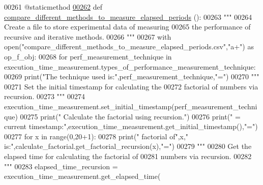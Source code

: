 \begin{DoxyCode}
00261     @staticmethod
\hypertarget{performance__measurement_8py_source_l00262}{}\hyperlink{classutilities_1_1timing__measurements_1_1performance__measurement_1_1execution__time__measurement_a9b05f1fd5acd56880daa42266dbf8284}{00262}     \textcolor{keyword}{def }\hyperlink{classutilities_1_1timing__measurements_1_1performance__measurement_1_1execution__time__measurement_a9b05f1fd5acd56880daa42266dbf8284}{compare\_different\_methods\_to\_measure\_elapsed\_periods}
      ():
00263         \textcolor{stringliteral}{"""}
00264 \textcolor{stringliteral}{            Create a file to store experimental data of measuring}
00265 \textcolor{stringliteral}{                the performance of recursive and iterative methods.}
00266 \textcolor{stringliteral}{        """}
00267         with open(\textcolor{stringliteral}{"compare\_different\_methods\_to\_measure\_elapsed\_periods.csv"},\textcolor{stringliteral}{"a+"}) \textcolor{keyword}{as} op\_f\_obj:
00268             \textcolor{keywordflow}{for} perf\_measurement\_technique \textcolor{keywordflow}{in} 
      execution\_time\_measurement.types\_of\_performance\_measurement\_technique:
00269                 print(\textcolor{stringliteral}{"The technique used is:"},perf\_measurement\_technique,\textcolor{stringliteral}{"="})
00270                 \textcolor{stringliteral}{"""}
00271 \textcolor{stringliteral}{                    Set the initial timestamp for calculating the}
00272 \textcolor{stringliteral}{                        factorial of numbers via recursion.}
00273 \textcolor{stringliteral}{                """}
00274                 execution\_time\_measurement.set\_initial\_timestamp(perf\_measurement\_technique)
00275                 print(\textcolor{stringliteral}{" Calculate the factorial using recursion."})
00276                 print(\textcolor{stringliteral}{" = current timestamp:"},execution\_time\_measurement.get\_initial\_timestamp(),\textcolor{stringliteral}{"="})
00277                 \textcolor{keywordflow}{for} x \textcolor{keywordflow}{in} range(0,20+1):
00278                     print(\textcolor{stringliteral}{"     factorial of"},x,\textcolor{stringliteral}{" is:"},calculate\_factorial.get\_factorial\_recursion(x),\textcolor{stringliteral}{"="})
00279                 \textcolor{stringliteral}{"""}
00280 \textcolor{stringliteral}{                    Get the elapsed time for calculating the factorial of}
00281 \textcolor{stringliteral}{                        numbers via recursion.}
00282 \textcolor{stringliteral}{                """}
00283                 elapsed\_time\_recursion = execution\_time\_measurement.get\_elapsed\_time(

\end{DoxyCode}
